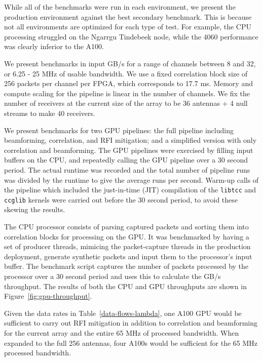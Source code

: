 \documentclass{pas}
\begin{document}
While all of the benchmarks were run in each environment, we present the production environment against the best secondary benchmark. 
This is because not all environments are optimized for each type of test. For example, the CPU processing struggled on the Ngarrgu Tindebeek node, while 
the 4060 performance was clearly inferior to the A100.

We present benchmarks in input GB/s for a range of channels between 8 and 32, or 6.25 - 25 MHz of usable bandwidth. 
We use a fixed correlation block size of 256 packets per channel per FPGA, which corresponds to 17.7 ms.
Memory and compute scaling for the pipeline is linear in the number of channels.
We fix the number of receivers at the current size of the array to be 36 antennas + 4 null streams to make 40 receivers.

We present benchmarks for two GPU pipelines: the full pipeline including beamforming, correlation, and RFI mitigation; and a simplified version with only correlation and beamforming. 
The GPU pipelines were exercised by filling input buffers on the CPU, and repeatedly calling the GPU pipeline over a 30 second period. The actual runtime was recorded
and the total number of pipeline runs was divided by the runtime to give the average runs per second. Warm-up calls of the pipeline which included the just-in-time (JIT) compilation of the \texttt{libtcc} and \texttt{ccglib} kernels were carried out before the 30 second period, to avoid these skewing the results.

The CPU processor consists of parsing captured packets and sorting them into correlation blocks for processing on the GPU.
It was benchmarked by having a set of producer threads, mimicing the packet-capture threads in the production deployment, generate synthetic packets and input them 
to the processor's input buffer. 
The benchmark script captures the number of packets processed by the processor over a 30 second period and uses this to calculate the GB/s throughput.
The results of both the CPU and GPU throughputs are shown in Figure~\ref{fig:gpu-throughput}.

Given the data rates in Table~\ref{data-flows-lambda}, one A100 GPU would be sufficient to carry out RFI mitigation in addition to correlation and beamforming for the current array and the entire 65 MHz of processed bandwidth. When expanded to the full 256 antennas, four A100s would be sufficient for the 65 MHz processed bandwidth.
\end{document}

